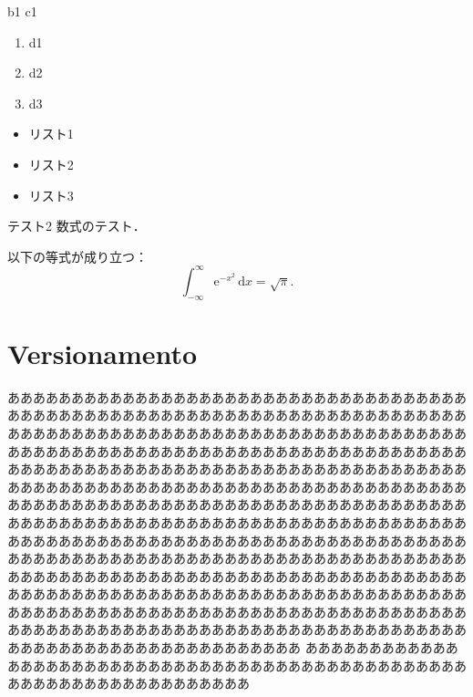 \documentclass{beamer}
\begin{document}
\begin{frame}{b1}
  c1

  \pause

  \begin{enumerate}
  \item d1\pause
  \item d2\pause
  \item d3
  \end{enumerate}

  \pause

  \begin{itemize}
  \item リスト1\pause
  \item リスト2\pause
  \item リスト3
  \end{itemize}
\end{frame}

\begin{frame}{テスト2}
  数式のテスト．

  \begin{theorem}[Gauss積分]
    以下の等式が成り立つ：
    \begin{equation}
      \int_{-\infty}^\infty \mathrm{e}^{-x^2}\,\mathrm{d}x=\sqrt{\pi}.
    \end{equation}
  \end{theorem}
\end{frame}

\section{Versionamento}
\begin{frame}
あああああああああああああああああああああああああああああああああああああああああああああああああああああああああああああああああああああああああああああああああああああああああああああああああああああああああああああああああああああああああああああああああああああああああああああああああああああああああああああああああああああああああああああああああああああああああああああああああああああああああああああああああああああああああああああああああああああああああああああああああああああああああああああああああああああああああああああああああああああああああああああああああああああああああああああああああああああああああああああああああああああああああああああああああああああああああああああああああああああああああああああああああああああああああああああああああああああああああああああああああああああああああああああああああああああああああああああああああああああああああああああああああああああああああああああああああああああああああああああああああああああああああああああああああああああああああああああああああああああああああああああああ
あああああああああああああああああああああああああああああああああああああああああああああああああああああああああああああああああああ
\end{frame}
\end{document}
